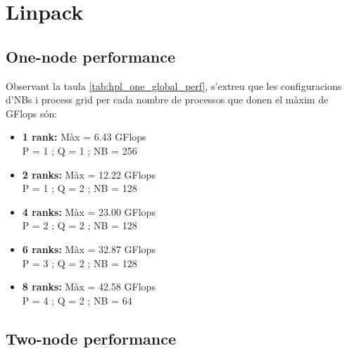 \section{Linpack}
\subsection{One-node performance}
Observant la taula \ref{tab:hpl_one_global_perf}, s'extreu que les configuracions d'NBs i process grid per cada nombre de processos que donen el màxim de GFlops són:
\begin{itemize}
    \item \textbf{1 rank: } Màx =  6.43 GFlops  \\ P = 1  ; Q = 1  ; NB = 256
    \item \textbf{2 ranks:} Màx = 12.22 GFlops  \\ P = 1  ; Q = 2  ; NB = 128
    \item \textbf{4 ranks:} Màx = 23.00 GFlops  \\ P = 2  ; Q = 2  ; NB = 128
    \item \textbf{6 ranks:} Màx = 32.87 GFlops  \\ P = 3  ; Q = 2  ; NB = 128
    \item \textbf{8 ranks:} Màx = 42.58 GFlops  \\P = 4  ; Q = 2  ; NB = 64

\end{itemize}




\subsection{Two-node performance}


